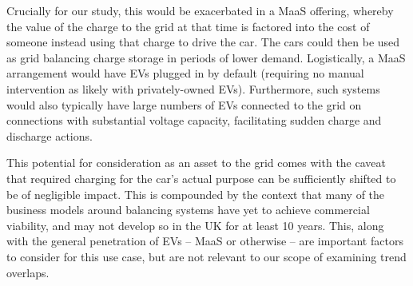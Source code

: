 \documentclass[journal]{IEEEtran}
\begin{document}
Crucially for our study, this would be exacerbated in a MaaS offering,
whereby the value of the charge to the grid at that time is factored
into the cost of someone instead using that charge to drive the
car. The cars could then be used as grid balancing charge storage in
periods of lower demand. Logistically, a MaaS arrangement would have
EVs plugged in by default (requiring no manual intervention as likely
with privately-owned EVs). Furthermore, such systems would also
typically have large numbers of EVs connected to the grid on
connections with substantial voltage capacity, facilitating sudden
charge and discharge actions.

This potential for consideration as an asset to the grid comes with
the caveat that required charging for the car's actual purpose can be
sufficiently shifted to be of negligible impact. This is compounded by
the context that many of the business models around balancing systems
have yet to achieve commercial viability, and may not develop so in
the UK for at least 10 years. This, along with the general penetration
of EVs -- MaaS or otherwise -- are important factors to consider for
this use case, but are not relevant to our scope of examining trend
overlaps.





\end{document}
